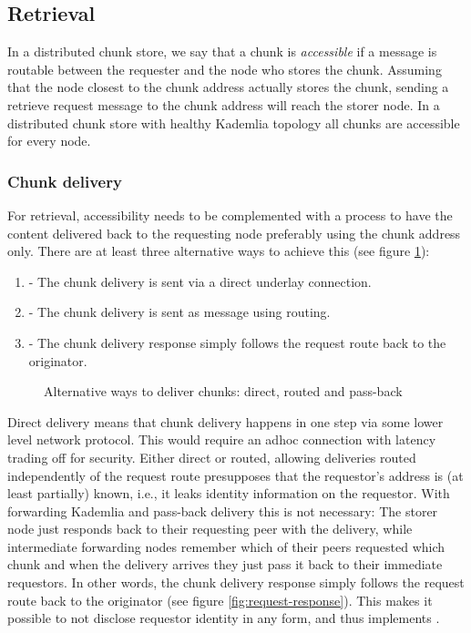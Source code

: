 \subsection{Retrieval}\label{sec:retrieval}

In a distributed chunk store, we say that a chunk is \emph{accessible} if a message is routable between the requester and the node who stores the chunk. Assuming that the node closest to the chunk address actually stores the chunk, sending a retrieve request message to the chunk address will reach the storer node. In a distributed chunk store with healthy Kademlia topology all chunks are accessible for every node.

\subsubsection{Chunk delivery}

For retrieval, accessibility needs to be complemented with a process to have the content delivered back to the requesting node preferably using the chunk address only. There are at least three alternative ways to achieve this (see figure \ref{fig:chunk-delivery}):

\begin{enumerate}
    \item {} - The chunk delivery is sent via a direct underlay connection. 
    \item {} - The chunk delivery is sent as message using routing.
    \item {} - The chunk delivery response simply follows the request route back to the originator.
\end{enumerate}


\begin{figure}[htbp]
   \centering
   \caption[Alternative ways to deliver chunks: direct, routed and pass-back]{Alternative ways to deliver chunks: direct, routed and pass-back}
   \label{fig:chunk-delivery}
\end{figure}

Direct delivery means that chunk delivery happens in one step via some lower level network protocol. This would require an adhoc connection with latency trading off for security. Either direct or routed, allowing deliveries routed independently of the request route presupposes that the requestor's address is (at least partially) known, i.e., it leaks identity information on the requestor. With forwarding Kademlia and pass-back delivery this is not necessary: The storer node just responds back to their requesting peer with the delivery, while intermediate forwarding nodes remember which of their peers requested which chunk and when the delivery arrives they just pass it back to their immediate requestors. In other words, the chunk delivery response simply follows the request route back to the originator (see figure \ref{fig:request-response}). This makes it possible to not disclose requestor identity in any form, and thus implements . 

